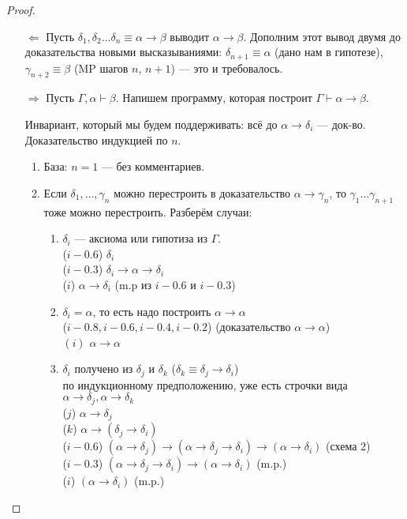 \begin{proof}
    \begin{itemize}
        \item [$\Leftarrow $]
        Пусть $\delta_1, \delta_2\ldots \delta_n \equiv \alpha \to \beta$ выводит $\alpha \to \beta$.
        Дополним этот вывод двумя до доказательства новыми высказываниями: $\delta_{n+1} \equiv \alpha$ (дано нам в гипотезе), $\gamma_{n+2} \equiv \beta$ (MP шагов $n$, $n+1$) --- это и требовалось.
        \item [$\Rightarrow $]  Пусть $\Gamma, \alpha \vdash \beta$. Напишем программу, которая построит $\Gamma \vdash \alpha \to \beta$.

        Инвариант, который мы будем поддерживать: всё до $\alpha \to \delta_i $ --- док-во.
        Доказательство индукцией по $n$.
        \begin{enumerate}
            \item База: $n=1$ --- без комментариев.
            \item Если $\delta_1,\ldots, \gamma_n$ можно перестроить в доказательство $\alpha \to \gamma_n$, то $\gamma_1 \ldots \gamma_{n+1}$ тоже можно перестроить.
            Разберём случаи:
            \begin{enumerate}
                \item $\delta_i$ --- аксиома или гипотиза из $\Gamma$. \\
                ($i - 0.6$) $\delta_{i}$ \\
                ($i - 0.3$) $\delta_i \to \alpha \to \delta_i$\\
                ($i$) $\alpha \to \delta_i$ (m.p из $i-0.6$ и $i - 0.3$)
                \item $\delta_i = \alpha$, то есть надо построить $\alpha \to \alpha$\\
                ($i - 0.8, i-0.6, i-0.4, i-0.2$) (доказательство $\alpha \to \alpha$) \\
                $(i)$ $\alpha\to\alpha$
                \item $\delta_i$ получено из $\delta_j$ и $\delta_k$ ($\delta_k \equiv \delta_j \to \delta_i$)\\
                по индукционному предположению, уже есть строчки вида $\alpha \to \delta_j, \alpha \to \delta_k$\\
                ($j$) $\alpha \to \delta_j$\\
                ($k$) $\alpha \to (\delta_j \to \delta_i)$\\
                ($i - 0.6$) $(\alpha \to \delta_j) \to (\alpha \to \delta_j \to \delta_i) \to (\alpha \to \delta_i)$ (схема 2)\\
                ($i - 0.3$) $(\alpha \to \delta_j \to \delta_i) \to (\alpha \to \delta_i)$ (m.p.)\\
                ($i$) $(\alpha \to \delta_i)$ (m.p.)
            \end{enumerate}
        \end{enumerate}
    \end{itemize}
\end{proof}

